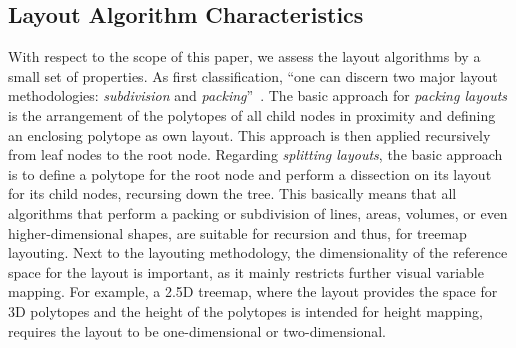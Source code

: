 \documentclass[sigconf%
,natbib=true%
]{acmart}
\begin{document}
\subsection{Layout Algorithm Characteristics}
With respect to the scope of this paper, we assess the layout algorithms by a small set of properties.
As first classification, \enquote{one can discern two major layout methodologies: \emph{subdivision} and \emph{packing}}~\cite{schulz2011-implicit}.
The basic approach for \emph{packing layouts} is the arrangement of the polytopes of all child nodes in proximity and defining an enclosing polytope as own layout.
This approach is then applied recursively from leaf nodes to the root node.
Regarding \emph{splitting layouts}, the basic approach is to define a polytope for the root node and perform a dissection on its layout for its child nodes, recursing down the tree.
This basically means that all algorithms that perform a packing or subdivision of lines, areas, volumes, or even higher-dimensional shapes, are suitable for recursion and thus, for treemap layouting.
Next to the layouting methodology, the dimensionality of the reference space for the layout is important, as it mainly restricts further visual variable mapping.
For example, a 2.5D treemap, where the layout provides the space for 3D polytopes and the height of the polytopes is intended for height mapping, requires the layout to be one-dimensional or two-dimensional.
\end{document}
